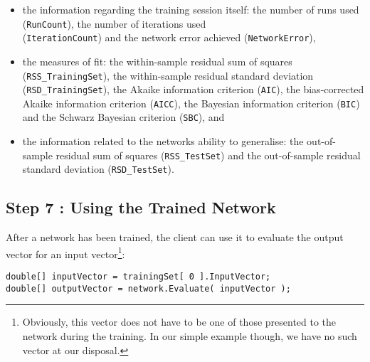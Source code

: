 \begin{itemize}
\item the information regarding the training session itself: the number of runs used (\texttt{RunCount}), the number of iterations used\\ (\texttt{IterationCount}) and the network error achieved (\texttt{NetworkError}),
\item the measures of fit: the within-sample residual sum of squares\\(\texttt{RSS\_TrainingSet}), the within-sample residual standard deviation (\texttt{RSD\_TrainingSet}), the Akaike information criterion (\texttt{AIC}), the bias-corrected Akaike information criterion (\texttt{AICC}), the Bayesian information criterion (\texttt{BIC}) and the Schwarz Bayesian criterion (\texttt{SBC}), and
\item the information related to the networks ability to generalise: the out-of-sample residual sum of squares (\texttt{RSS\_TestSet}) and the out-of-sample residual standard deviation (\texttt{RSD\_TestSet}).
\end{itemize}

\subsection{Step 7 : Using the Trained Network}

After a network has been trained, the client can use it to evaluate the output vector for an input vector\footnote{Obviously, this vector does not have to be one of those presented to the network during the training. In our simple example though, we have no such vector at our disposal.}:

\medskip
\noindent \texttt{double[] inputVector = trainingSet[ 0 ].InputVector;\\
double[] outputVector = network.Evaluate( inputVector );}
\medskip